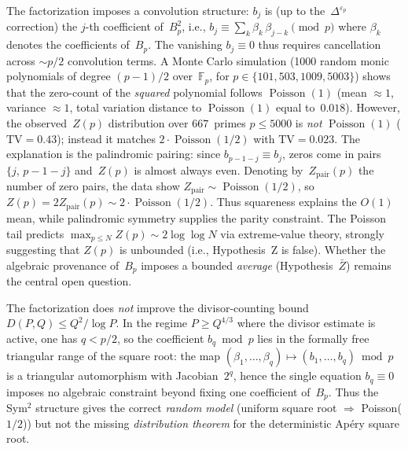 \documentclass[11pt]{article}
\theoremstyle{definition}
\theoremstyle{remark}
\begin{document}
\begin{enumerate}
The factorization imposes a convolution
structure: $b_j$ is (up to the~$\Delta^{\varepsilon_p}$ correction)
the $j$-th coefficient of~$B_p^2$, i.e.,
$b_j \equiv \sum_k \beta_k\, \beta_{j-k} \pmod{p}$
where $\beta_k$ denotes the coefficients of~$B_p$.
The vanishing $b_j \equiv 0$ thus
requires cancellation across $\sim p/2$
convolution terms.
A Monte Carlo simulation
(1000 random monic polynomials
of degree $(p-1)/2$ over~$\mathbb{F}_p$,
for $p \in \{101, 503, 1009, 5003\}$)
shows that the zero-count of the \emph{squared}
polynomial follows $\operatorname{Poisson}(1)$
(mean $\approx 1$, variance $\approx 1$,
total variation distance to $\operatorname{Poisson}(1)$
equal to~$0.018$).
However, the observed~$Z(p)$ distribution
over $667$~primes $p \le 5000$ is \emph{not}
$\operatorname{Poisson}(1)$ ($\mathrm{TV} = 0.43$);
instead it matches
$2 \cdot \operatorname{Poisson}(1/2)$
with $\mathrm{TV} = 0.023$.
The explanation is the palindromic pairing:
since $b_{p-1-j} \equiv b_j$,
zeros come in pairs $\{j,\, p{-}1{-}j\}$
and~$Z(p)$ is almost always even.
Denoting by~$Z_{\mathrm{pair}}(p)$ the
number of zero pairs,
the data show
$Z_{\mathrm{pair}} \sim \operatorname{Poisson}(1/2)$,
so $Z(p) = 2 Z_{\mathrm{pair}}(p)
\sim 2 \cdot \operatorname{Poisson}(1/2)$.
Thus squareness explains the $O(1)$ mean,
while palindromic symmetry supplies the
parity constraint.
The Poisson tail predicts
$\max_{p \le N} Z(p) \sim 2\log\log N$
via extreme-value theory,
strongly suggesting that $Z(p)$ is unbounded
(i.e., Hypothesis~Z is false).
Whether the algebraic provenance of~$B_p$
imposes a bounded \emph{average}
(Hypothesis~$\bar{Z}$)
remains the central open question.

The factorization does \emph{not} improve the
divisor-counting bound $D(P,Q) \le Q^2/\!\log P$.
In the regime $P \ge Q^{4/3}$ where the divisor
estimate is active, one has $q < p/2$, so
the coefficient $b_q \bmod p$ lies in the
formally free triangular range of the
square root: the map
$(\beta_1,\ldots,\beta_q)
\mapsto (b_1,\ldots,b_q) \bmod p$
is a triangular automorphism with Jacobian~$2^q$,
hence the single equation $b_q \equiv 0$
imposes no algebraic constraint beyond
fixing one coefficient of~$B_p$.
Thus the Sym$^2$ structure gives the correct
\emph{random model} (uniform square root
$\Rightarrow$ Poisson($1/2$))
but not the missing \emph{distribution theorem}
for the deterministic Ap\'ery square root.


\end{enumerate}
\end{document}
